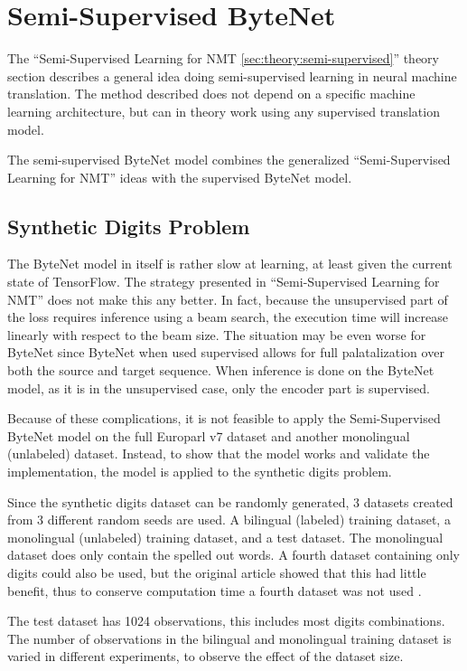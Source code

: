 
\section{Semi-Supervised ByteNet}

The ``Semi-Supervised Learning for NMT \ref{sec:theory:semi-supervised}'' theory section describes a general idea doing semi-supervised learning in neural machine translation. The method described does not depend on a specific machine learning architecture, but can in theory work using any supervised translation model.

The semi-supervised ByteNet model combines the generalized ``Semi-Supervised Learning for NMT'' ideas with the supervised ByteNet model.

\subsection{Synthetic Digits Problem}

The ByteNet model in itself is rather slow at learning, at least given the current state of TensorFlow. The strategy presented in ``Semi-Supervised Learning for NMT'' does not make this any better. In fact, because the unsupervised part of the loss requires inference using a beam search, the execution time will increase linearly with respect to the beam size. The situation may be even worse for ByteNet since ByteNet when used supervised allows for full palatalization over both the source and target sequence. When inference is done on the ByteNet model, as it is in the unsupervised case, only the encoder part is supervised.

Because of these complications, it is not feasible to apply the Semi-Supervised ByteNet model on the full Europarl v7 dataset and another monolingual (unlabeled) dataset. Instead, to show that the model works and validate the implementation, the model is applied to the synthetic digits problem.

Since the synthetic digits dataset can be randomly generated, 3 datasets created from 3 different random seeds are used. A bilingual (labeled) training dataset, a monolingual (unlabeled) training dataset, and a test dataset. The monolingual dataset does only contain the spelled out words. A fourth dataset containing only digits could also be used, but the original article showed that this had little benefit, thus to conserve computation time a fourth dataset was not used \cite{semi-supervied}.

The test dataset has 1024 observations, this includes most digits combinations. The number of observations in the bilingual and monolingual training dataset is varied in different experiments, to observe the effect of the dataset size.


